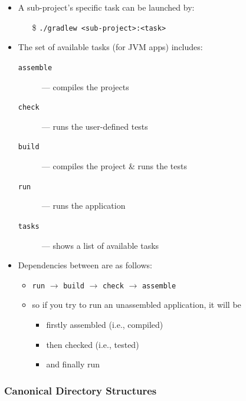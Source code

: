 \documentclass[presentation]{beamer}\mode<presentation>{\usetheme{AMSBolognaFC}}
\begin{document}
\begin{frame}[allowframebreaks]
\begin{itemize}
        \bigskip

        \item A sub-project's specific task can be launched by:
        \begin{itemize}
            \item[\$] \texttt{./gradlew \alert{<sub-project>}:\alert{<task>}}
        \end{itemize}

        \framebreak

        \item The set of available tasks (for JVM apps) includes:
        \begin{description}
            \item[\texttt{assemble}] --- compiles the projects
            \item[\texttt{check}] --- runs the user-defined tests
            \item[\texttt{build}] --- compiles the project \& runs the tests
            \item[\texttt{run}] --- runs the application
            \item[\texttt{tasks}] --- shows a list of available tasks
        \end{description}

        \bigskip

        \item Dependencies between are as follows:
        \begin{itemize}
            \item \texttt{run} $\rightarrow$ \texttt{build} $\rightarrow$ \texttt{check} $\rightarrow$ \texttt{assemble}

            \item so if you try to run an unassembled application, it will be
            \begin{itemize}
                \item firstly \alert{assembled} (i.e., compiled)
                \item then \alert{checked} (i.e., tested)
                \item and finally \alert{run}
            \end{itemize}
        \end{itemize}
    \end{itemize}

\end{frame}

\subsubsection{Canonical Directory Structures}
\end{document}
